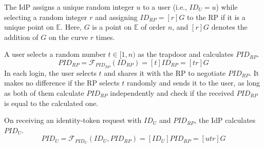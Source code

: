 The IdP assigns a unique random integer $u$ to a user (i.e., $ID_U = u$) while selecting a random integer $r$ and assigning $ID_{RP} = [r]G$ to the RP if it is a unique point on $\mathbb{E}$.
Here, $G$ is a point on $\mathbb{E}$ of order $n$, and $[r]G$ denotes the addition of $G$ on the curve $r$ times.




 A user selects a random number $t \in [1, n)$ as the trapdoor and calculates $PID_{RP}$.
\begin{equation}
PID_{RP} = \mathcal{F}_{PID_{RP}}(ID_{RP}) = [t]{ID_{RP}} = [tr]G
\label{equ:PIDRP}
\end{equation}
\newc
In each login, the user selects $t$ and shares it with the RP to negotiate $PID_{RP}$.
It makes no difference if the RP selects $t$ randomly and sends it to the user, as long as both of them calculate $PID_{RP}$ independently and check if the received $PID_{RP}$ is equal to the calculated one.

\oldc
{}
On receiving an identity-token request with $ID_U$ and $PID_{RP}$, the IdP calculates $PID_{U}$.
\begin{equation}
PID_{U} = \mathcal{F}_{PID_U}(ID_U, PID_{RP}) =
  [{ID_U}]{PID_{RP}} = [utr]G
 \label{equ:PIDU}
\end{equation}


